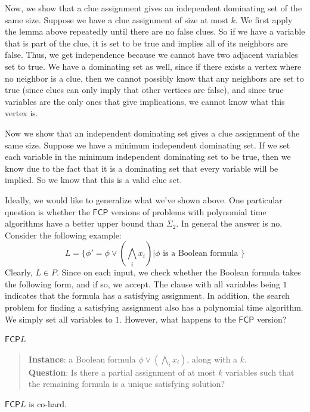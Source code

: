 \documentclass[runningheads,a4paper]{llncs}
\begin{document}
Now, we show that a clue assignment gives an independent dominating set of the same size. Suppose we have a clue assignment of size at most $k$. We first apply the lemma above repeatedly until there are no false clues. So if we have a variable that is part of the clue, it is set to be true and implies all of its neighbors are false. Thus, we get independence because we cannot have two adjacent variables set to true. We have a dominating set as well, since if there exists a vertex where no neighbor is a clue, then we cannot possibly know that any neighbors are set to true (since clues can only imply that other vertices are false), and since true variables are the only ones that give implications, we cannot know what this vertex is. 

Now we show that an independent dominating set gives a clue assignment of the same size. Suppose we have a minimum independent dominating set. If we set each variable in the minimum independent dominating set to be true, then we know due to the fact that it is a dominating set that every variable will be implied. So we know that this is a valid clue set.

Ideally, we would like to generalize what we've shown above. One particular question is whether the $\mathsf{FCP}$ versions of problems with polynomial time algorithms have a better upper bound than $\Sigma_2$. In general the answer is no. Consider the following example:
\[ L = \{ \phi' = \phi \vee \left( \bigwedge_i x_i \right) | \phi \text{ is a Boolean formula }\} \]
Clearly, $L \in P$. Since on each input, we check whether the Boolean formula takes the following form, and if so, we accept. The clause with all variables being $1$ indicates that the formula has a satisfying assignment. In addition, the search problem for finding a satisfying assignment also has a polynomial time algorithm. We simply set all variables to $1$. However, what happens to the $\mathsf{FCP}$ version?

$\mathsf{FCP} L$ 
\begin{quote}
\textbf{Instance}: a Boolean formula $\phi \vee \left( \bigwedge_i x_i\right)$, along with a $k$.\\
\textbf{Question}: Is there a partial assignment of at most $k$ variables such that the remaining formula is a unique satisfying solution?
\end{quote}

\begin{proposition}
$\mathsf{FCP} L$ is co\NP-hard.
\end{proposition}
\end{document}

